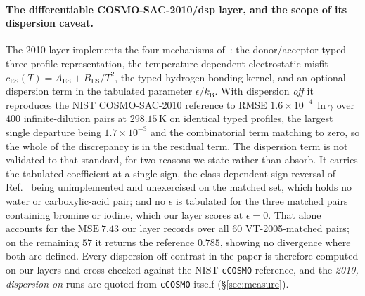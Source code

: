 \paragraph{The differentiable COSMO-SAC-2010/dsp layer, and the scope of its dispersion caveat.}
The 2010 layer implements the four mechanisms of~\cite{hsieh2010,hsieh2014dsp}: the donor/acceptor-typed
three-profile representation, the temperature-dependent electrostatic misfit
$c_{\mathrm{ES}}(T)=A_{\mathrm{ES}}+B_{\mathrm{ES}}/T^2$, the typed hydrogen-bonding kernel, and an
optional dispersion term in the tabulated parameter $\epsilon/k_{\mathrm{B}}$. With dispersion
\emph{off} it reproduces the NIST COSMO-SAC-2010 reference to RMSE
$1.6\times10^{-4}\,\ln\gamma$ over $400$ infinite-dilution pairs at $298.15$\,K on identical typed
profiles, the largest single departure being $1.7\times10^{-3}$ and the combinatorial term matching
to zero, so the whole of the discrepancy is in the residual term. The dispersion term is not validated to that standard, for two
reasons we state rather than absorb. It carries the tabulated coefficient at a single sign, the
class-dependent sign reversal of Ref.~\cite{hsieh2014dsp} being unimplemented and unexercised on the
matched set, which holds no water or carboxylic-acid pair; and no $\epsilon$ is tabulated for the
three matched pairs containing bromine or iodine, which our layer scores at $\epsilon{=}0$. That
alone accounts for the $\mathrm{MSE}\ 7.43$ our layer records over all $60$ VT-2005-matched pairs; on the
remaining $57$ it returns the reference $0.785$, showing no divergence where both are defined. Every
dispersion-off contrast in the paper is therefore computed on our layers and cross-checked against
the NIST \texttt{cCOSMO} reference, and the \emph{2010, dispersion on} runs are quoted from \texttt{cCOSMO}
itself (\S\ref{sec:measure}).
